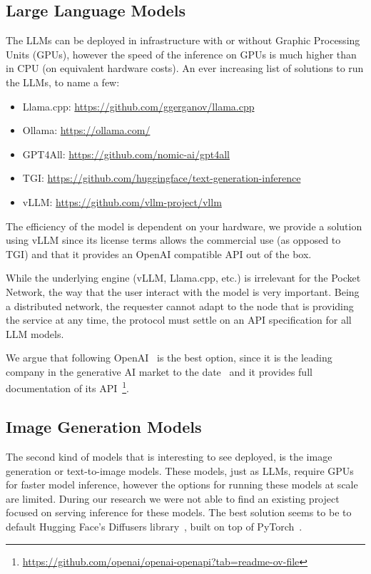 \subsection{Large Language Models}
The LLMs can be deployed in infrastructure with or without Graphic Processing Units (GPUs), however the speed of the inference on GPUs is much higher than in CPU (on equivalent hardware costs). An ever increasing list of solutions to run the LLMs, to name a few:
\begin{itemize}
    \item Llama.cpp: \url{https://github.com/ggerganov/llama.cpp}
    \item Ollama: \url{https://ollama.com/}
    \item GPT4All: \url{https://github.com/nomic-ai/gpt4all}
    \item TGI: \url{https://github.com/huggingface/text-generation-inference}
    \item vLLM: \url{https://github.com/vllm-project/vllm}
\end{itemize}
The efficiency of the model is dependent on your hardware, we provide a solution using vLLM since its license terms allows the commercial use (as opposed to TGI) and that it provides an OpenAI compatible API out of the box.

While the underlying engine (vLLM, Llama.cpp, etc.) is irrelevant for the Pocket Network, the way that the user interact with the model is very important. Being a distributed network, the requester cannot adapt to the node that is providing the service at any time, the protocol must settle on an API specification for all LLM models. 

We argue that following OpenAI~\cite{openAI_API} is the best option, since it is the leading company in the generative AI market to the date~\cite{generative_ai_market} and it provides full documentation of its API~\footnote{\url{https://github.com/openai/openai-openapi?tab=readme-ov-file}}.
 
\subsection{Image Generation Models}
The second kind of models that is interesting to see deployed, is the image generation or text-to-image models. These models, just as LLMs, require GPUs for faster model inference, however the options for running these models at scale are limited. 
During our research we were not able to find an existing project focused on serving inference for these models. The best solution seems to be to default Hugging Face's Diffusers library~\cite{hf_diffusers}, built on top of PyTorch~\cite{paszke2017automatic}. 

